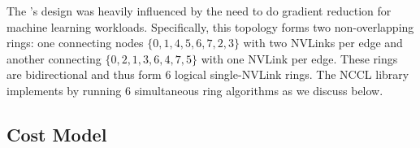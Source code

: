 
The \dgxone's design was heavily influenced by the need to do gradient reduction for machine learning workloads. Specifically, this topology forms two non-overlapping rings: one connecting nodes $\{0,1,4,5,6,7,2,3\}$ with two NVLinks per edge and another connecting $\{0,2,1,3,6,4,7,5\}$ with one NVLink per edge. These rings are bidirectional and thus form $6$ logical single-NVLink rings. The NCCL library implements \allgather by running $6$ simultaneous ring algorithms as we discuss below.  


\subsection{Cost Model}
  
